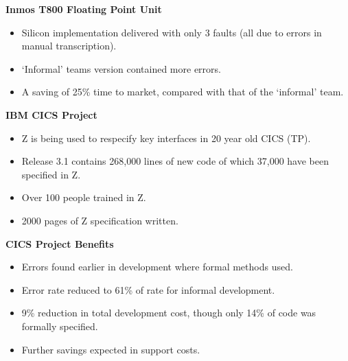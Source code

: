 \begin{slide}{}
\begin{center}
{\bf  Inmos T800 Floating Point Unit}

\end{center}

\begin{itemize}
\item
Silicon implementation delivered with only 3 faults (all due to errors in manual transcription).
\item
`Informal' teams version contained more errors.
\item
A saving of 25\% time to market, compared with that of the `informal' team.
\end{itemize}

\end{slide}

\begin{slide}{}
\begin{center}
{\bf  IBM CICS Project}
\end{center}

\begin{itemize}
\item
Z is being used to respecify key interfaces in 20 year old CICS (TP).
\item
Release 3.1 contains 268,000 lines of new code of which 37,000 have been specified in Z.
\item
Over 100 people trained in Z.
\item
2000 pages of Z specification written.
\end{itemize}

\end{slide}


\begin{slide}{}
\begin{center}
{\bf  CICS Project Benefits}
\end{center}

\begin{itemize}
\item
Errors found earlier in development where formal methods used.
\item
Error rate reduced to 61\% of rate for informal development.
\item
9\% reduction in total development cost, though only 14\% of code was formally specified.
\item
Further savings expected in support costs.
\end{itemize}
\end{slide}

